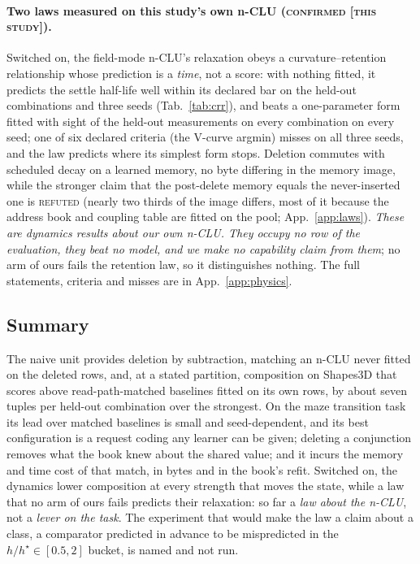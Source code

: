 \documentclass{article} %
\begin{document}
\paragraph{Two laws measured on this study's own n-CLU (\textsc{confirmed [this study]}).}
Switched on, the field-mode n-CLU's relaxation obeys a curvature--retention relationship whose
prediction is a \emph{time}, not a score: with nothing fitted, it predicts the settle half-life
well within its declared bar on the held-out combinations and three seeds (Tab.~\ref{tab:crr}), and beats a one-parameter form fitted with sight of the held-out measurements
on every combination on every seed; one of six declared criteria (the V-curve argmin) misses on
all three seeds, and the law predicts where its simplest form stops.
Deletion commutes with scheduled decay on a learned memory, no byte differing in the memory
image, while the stronger claim that the post-delete memory equals the never-inserted one is
\textsc{refuted} (nearly two thirds of the image differs, most of it because the address book
and coupling table are fitted on the pool; App.~\ref{app:laws}). %
\emph{These are dynamics results about our own n-CLU. They occupy no row of the evaluation, they
beat no model, and we make no capability claim from them}; no arm of ours fails the retention law,
so it distinguishes nothing. The full statements, criteria and misses are in
App.~\ref{app:physics}.

\subsection{Summary}
\label{sec:leaving}

The naive unit provides deletion by subtraction, matching an n-CLU never fitted on the deleted rows, and, at a stated partition, composition on
Shapes3D that scores above read-path-matched baselines fitted on its own rows, by about seven tuples per
held-out combination over the strongest. On the maze transition task its lead over matched
baselines is small and seed-dependent, and its best configuration is a request coding any learner can be
given; deleting a conjunction removes what the book knew about the shared value; and it incurs the
memory and time cost of that match, in bytes and in the book's refit. Switched on, the dynamics lower composition at
every strength that moves the state, while a law that no arm of ours fails predicts their relaxation:
so far a \emph{law about the n-CLU}, not a \emph{lever on the task}. The experiment that would make
the law a claim about a class, a comparator predicted in advance to be mispredicted in the
$h/h^\star\in[0.5,2]$ bucket, is named and not run. %
\end{document}
